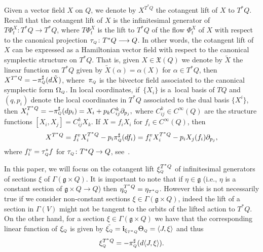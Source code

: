 \documentclass[10pt,a4paper]{amsart}
\numberwithin{equation}{section}
\def\g{\mathfrak{g}}
\def\subQQ{{\mbox{\tiny{$Q$}}}}
\begin{document}
Given a vector f\/ield $X$ on $Q$, we denote by $X^{T^*Q}$ the cotangent lift of $X$ to $T^*Q$.
Recall that the cotangent lift of $X$ is the inf\/initesimal generator of $T\Phi_t^X\colon T^*Q \to T^*Q$,
where $T\Phi^X_t$ is the lift to $T^*Q$ of the f\/low $\Phi_t^X$ of $X$ with respect
to the canonical projection $\tau_\subQQ\colon T^*Q\longrightarrow Q$.
In other words, the cotangent lift of $X$ can be expressed
as a Hamiltonian vector f\/ield with respect to the canonical symplectic structure on $T^*Q$.
That is, given $X\in \mathfrak{X}(Q)$ we denote by $\tilde{X}$ the linear function on $T^*Q$ given by
$\tilde{X} (\alpha) = \alpha(X)$ for $\alpha\in T^*Q$, then
$X^{T^*Q} = -\pi_{\mbox{\tiny{$Q$}}}^\sharp(d\tilde{X})$, where~$\pi_{\mbox{\tiny{$Q$}}}$
is the bivector f\/ield associated to the canonical symplectic form $\Omega_{\mbox{\tiny{$Q$}}}$.
In local coordinates, if~$\{X_i\}$ is a~local basis of $TQ$ and $(q,p_i)$
denote the local coordinates in $T^*Q$ associated to the dual basis $\{X^i\}$, then
$X_ i^{T^*Q} = - \pi_{\mbox{\tiny{$Q$}}}^\sharp(dp_i)= X_i + p_kC_{ij}^k\partial_{p_j},$
where $C_{ij}^k\in C^\infty(Q)$ are the structure functions $[X_i,X_j] = C_{ij}^k X_k$. If $X=f_i X_i$ for $f_i\in C^\infty(Q)$, then
\begin{gather*}
X^{T^*Q} = f_i^v X_i^{T^*Q} - p_i\pi_\subQQ^\sharp(df_i) = f^v_i X_i^{T^*Q} - p_iX_j(f_i)\partial_{p_j},
\end{gather*}
where $f^v_i = \tau_{\mbox{\tiny{$Q$}}}^*f$ for $\tau_{\mbox{\tiny{$Q$}}} \colon T^*Q\to Q$, see~\cite{MarsdenRatiuBook}.

In this paper, we will focus on the cotangent lift $\xi_{\mbox{\tiny{$Q$}}}^{T^*Q}$
of inf\/initesimal generators of sections $\xi$ of $\Gamma(\g \times Q)$.
It is important to note that if  $\eta\in \g$ (i.e., $\eta$ is a constant section of
$\g\times Q\to Q$) then $\eta_{\mbox{\tiny{$Q$}}}^{T^*Q} = \eta_{\mbox{\tiny{$T^*Q$}}}$.
However this is not necessarily true if we consider non-constant sections
$\xi\in \Gamma(\g\times Q)$, indeed the lift of a section in $\Gamma(V)$
might not be tangent to the orbits of the lifted action to $T^*Q$.
On the other hand, for a section $\xi\in \Gamma(\g\times Q)$ we have that the corresponding linear function of $\xi_\subQQ$ is given by
$\tilde{\xi_\subQQ} = {\bf i}_{\xi_{T^*Q}} \Theta_\subQQ = \langle J, \xi\rangle$
and thus
\begin{gather} \label{Eq:lift}
 \xi_\subQQ^{T^*Q} = - \pi_\subQQ^\sharp (d \langle J, \xi \rangle).
\end{gather}
\end{document}
